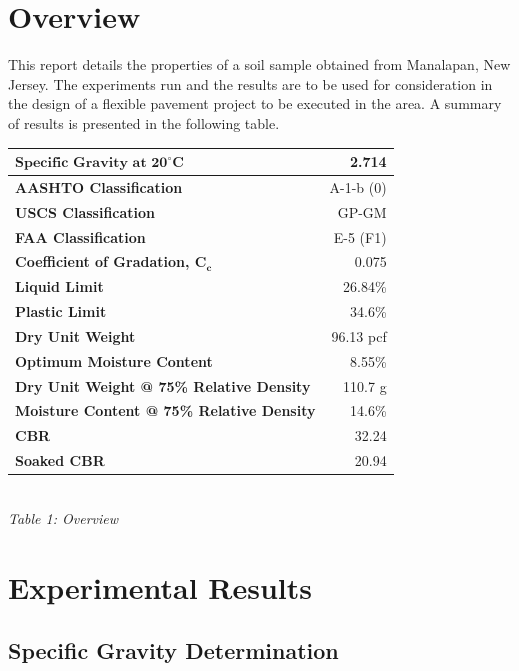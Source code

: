 \documentclass{article}
\begin{document}

\newpage
\doublespacing
\tableofcontents
\newpage
{}
\listoftables
{}
\listoffigures
\newpage
\section{Overview} 
\par This report details the properties of a soil sample obtained from Manalapan, New Jersey. The experiments run and the results are to be used for consideration in the design of a flexible pavement project to be executed in the area. A summary of results is presented in the following table. 
\begin{center}
\begin{tabular}{|l|r|}
    \hline 
    $\bm{\textbf{Specific Gravity at } 20^\circ\textbf{C}}$ & 2.714\\\hline
    \textbf{AASHTO Classification} & A-1-b (0)\\\hline 
    \textbf{USCS Classification} & GP-GM\\\hline 
    \textbf{FAA Classification} & E-5 (F1)\\\hline 
    \textbf{Coefficient of Gradation, $\bm{C_c}$} & 0.075\\\hline 
    \textbf{Liquid Limit} & 26.84\%\\\hline 
    \textbf{Plastic Limit} & 34.6\%\\\hline 
    \textbf{Dry Unit Weight} & 96.13 pcf\\\hline 
    \textbf{Optimum Moisture Content} & 8.55\%\\\hline 
    \textbf{Dry Unit Weight @ 75\% Relative Density} & 110.7 g \\\hline 
    \textbf{Moisture Content @ 75\% Relative Density} & 14.6\%\\\hline 
    \textbf{CBR} & 32.24\\\hline 
    \textbf{Soaked CBR} & 20.94\\\hline
\end{tabular}
\vspace{3mm}
\emph{\\Table 1: Overview}
\end{center}
\newpage
\section{Experimental Results}
\subsection{Specific Gravity Determination}
\end{document}
